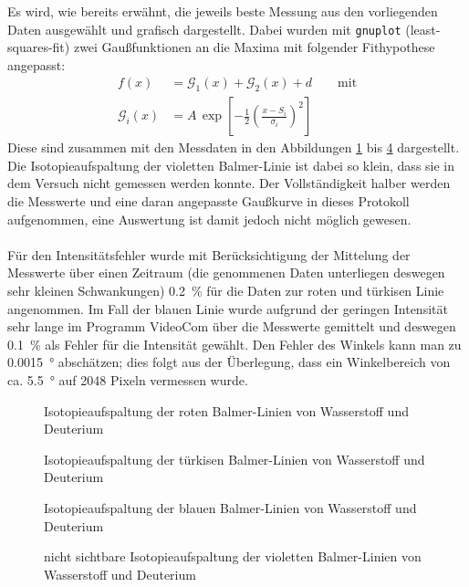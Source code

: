 \documentclass[11pt, a4paper]{article}
\numberwithin{equation}{section}
\begin{document}
Es wird, wie bereits erwähnt, die jeweils beste Messung aus den vorliegenden Daten ausgewählt und grafisch dargestellt.
Dabei wurden mit \texttt{gnuplot} (least-squares-fit) zwei Gaußfunktionen an die Maxima mit folgender Fithypothese angepasst:
\begin{align}
f(x)&=\mathcal{G}_1(x)+\mathcal{G}_2(x) + d\qquad\text{mit}\\
\mathcal{G}_i(x)&=A\,\exp\left[-\frac{1}{2}\left(\frac{x-S_i}{\sigma_i}\right)^2\right]
\label{eq:fithypothese_gauss}
\end{align}
Diese sind zusammen mit den Messdaten in den Abbildungen \ref{fig:aufspaltung_rot} bis  \ref{fig:aufspaltung_violett} dargestellt.
Die Isotopieaufspaltung der violetten Balmer-Linie ist dabei so klein, dass sie in dem Versuch nicht gemessen werden konnte.
Der Vollständigkeit halber werden die Messwerte und eine daran angepasste Gaußkurve in dieses Protokoll aufgenommen, eine Auswertung ist damit jedoch nicht möglich gewesen.\\
\\
Für den Intensitätsfehler wurde mit Berücksichtigung der Mittelung der Messwerte über einen Zeitraum (die genommenen Daten unterliegen deswegen sehr kleinen Schwankungen) \SI{0.2}{\percent} für die Daten zur roten und türkisen Linie angenommen.
Im Fall der blauen Linie wurde aufgrund der geringen Intensität sehr lange im Programm VideoCom über die Messwerte gemittelt und deswegen \SI{0.1}{\percent} als Fehler für die Intensität gewählt.
Den Fehler des Winkels kann man zu \SI{0.0015}{\degree} abschätzen; dies folgt aus der Überlegung, dass ein Winkelbereich von ca. \SI{5.5}{\degree} auf \num{2048} Pixeln vermessen wurde.
\begin{figure}[h]
\centering

\caption{Isotopieaufspaltung der roten Balmer-Linien von Wasserstoff und Deuterium}
\label{fig:aufspaltung_rot}
\end{figure}
\begin{figure}[h]
\centering

\caption{Isotopieaufspaltung der türkisen Balmer-Linien von Wasserstoff und Deuterium}
\label{fig:aufspaltung_tuerkis}
\end{figure}
\begin{figure}[h]
\centering

\caption{Isotopieaufspaltung der blauen Balmer-Linien von Wasserstoff und Deuterium}
\label{fig:aufspaltung_blau}
\end{figure}
\begin{figure}[h]
\centering

\caption{nicht sichtbare Isotopieaufspaltung der violetten Balmer-Linien von Wasserstoff und Deuterium}
\label{fig:aufspaltung_violett}
\end{figure}
\end{document}
